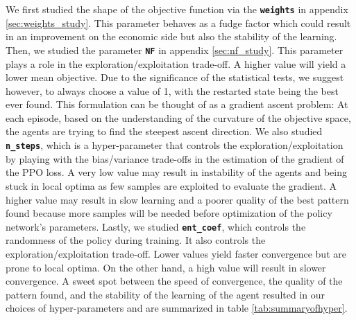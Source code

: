 \documentclass[a4paper]{article}
\newcommand{\code}[1]{\colorbox{light-gray}{\small\color{blue}\textbf{\texttt{#1}}}}
\begin{document}
We first studied the shape of the objective function via the \code{weights} in appendix \ref{sec:weights_study}.  This parameter behaves as a fudge factor which could result in an improvement on the economic side but also the stability of the learning. Then, we studied the parameter \code{NF} in appendix \ref{sec:nf_study}. This parameter plays a role in the exploration/exploitation trade-off. A higher value will yield a lower mean objective. Due to the significance of the statistical tests, we suggest however, to always choose a value of 1, with the restarted state being the best ever found. This formulation can be thought of as a gradient ascent problem: At each episode, based on the understanding of the curvature of the objective space, the agents are trying to find the steepest ascent direction. We also studied \code{n\_steps}, which is a hyper-parameter that controls the exploration/exploitation by playing with the bias/variance trade-offs in the estimation of the gradient of the PPO loss. A very low value may result in instability of the agents and being stuck in local optima as few samples are exploited to evaluate the gradient. A higher value may result in slow learning and a poorer quality of the best pattern found because more samples will be needed before optimization of the policy network's parameters. Lastly, we studied \code{ent\_coef}, which controls the randomness of the policy during training. It also controls the exploration/exploitation trade-off. Lower values yield faster convergence but are prone to local optima. On the other hand, a high value will result in slower convergence. A sweet spot between the speed of convergence, the quality of the pattern found, and the stability of the learning of the agent resulted in our choices of hyper-parameters and are summarized in table \ref{tab:summaryofhyper}. 
\end{document}
